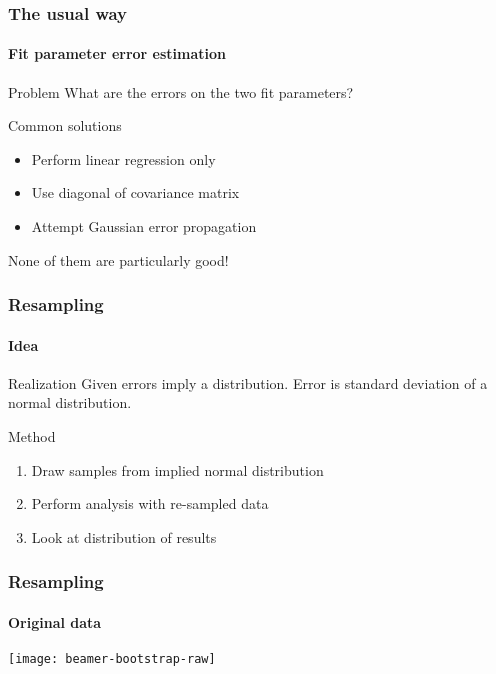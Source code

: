 \documentclass[english, fleqn]{beamer}
\begin{document}
\begin{frame}
    \frametitle{The usual way}
    \framesubtitle{Fit parameter error estimation}

    \begin{alertblock}{Problem}
        What are the errors on the two fit parameters?
    \end{alertblock}

    \pause

    \begin{block}{Common solutions}
        \begin{itemize}
            \item
                Perform linear regression only
            \item
                Use diagonal of covariance matrix
            \item
                Attempt Gaussian error propagation
        \end{itemize}
    \end{block}

    \pause

    None of them are particularly good!
\end{frame}


\begin{frame}
    \frametitle{Resampling}
    \framesubtitle{Idea}

    \begin{block}{Realization}
            Given errors imply a distribution. Error is standard deviation of a
            normal distribution.
    \end{block}

    \pause

    \begin{block}{Method}
        \begin{enumerate}
            \item Draw samples from implied normal distribution
            \item Perform analysis with re-sampled data
            \item Look at distribution of results
        \end{enumerate}
    \end{block}
\end{frame}

\begin{frame}
    \frametitle{Resampling}
    \framesubtitle{Original data}
    \centering
    \texttt{[image: beamer-bootstrap-raw]}
\end{frame}
\end{document}
